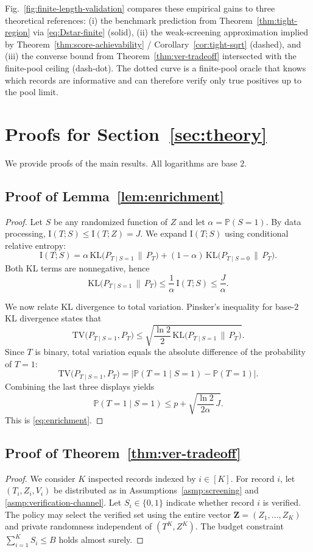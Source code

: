 \documentclass[twocolumn]{scholar7}
\newcommand{\Prob}{\mathbb{P}}
\newcommand{\KL}{\mathrm{KL}}
\newcommand{\I}{\mathrm{I}}
\newcommand{\abs}[1]{\left|#1\right|}
\newcommand{\bracks}[1]{\left[#1\right]}
\newcommand{\idx}[1]{\bracks{#1}} %
\begin{document}
\begin{appendix}
Fig.~\ref{fig:finite-length-validation} compares these empirical gains to three theoretical references: (i) the benchmark prediction from Theorem~\ref{thm:tight-region} via \eqref{eq:Dstar-finite} (solid), (ii) the weak-screening approximation implied by Theorem~\ref{thm:score-achievability} / Corollary~\ref{cor:tight-sqrt} (dashed), and (iii) the converse bound from Theorem~\ref{thm:ver-tradeoff} intersected with the finite-pool ceiling (dash-dot). The dotted curve is a finite-pool oracle that knows which records are informative and can therefore verify only true positives up to the pool limit.






\section{Proofs for Section~\ref{sec:theory}}
\label{sec:proofs}

We provide proofs of the main results.
All logarithms are base $2$.

\subsection{Proof of Lemma~\ref{lem:enrichment}}
\begin{proof}
Let $S$ be any randomized function of $Z$ and let $\alpha=\Prob(S=1)$.
By data processing, $\I(T;S)\le \I(T;Z)=J$.
We expand $\I(T;S)$ using conditional relative entropy:
\[
\I(T;S)
=
\alpha\,\KL\big(P_{T\mid S=1}\,\|\,P_T\big)
+
(1-\alpha)\,\KL\big(P_{T\mid S=0}\,\|\,P_T\big).
\]
Both KL terms are nonnegative, hence
\[
\KL\big(P_{T\mid S=1}\,\|\,P_T\big) \le \frac{1}{\alpha}\,\I(T;S) \le \frac{J}{\alpha}.
\]

We now relate KL divergence to total variation.
Pinsker's inequality for base-$2$ KL divergence states that
\[
\mathrm{TV}\big(P_{T\mid S=1},P_T\big)
\le
\sqrt{\frac{\ln 2}{2}\,\KL\big(P_{T\mid S=1}\,\|\,P_T\big)}.
\]
Since $T$ is binary, total variation equals the absolute difference of the probability of $T=1$:
\[
\mathrm{TV}\big(P_{T\mid S=1},P_T\big)
=
\abs{\Prob(T=1\mid S=1)-\Prob(T=1)}.
\]
Combining the last three displays yields
\[
\Prob(T=1\mid S=1)
\le
p + \sqrt{\frac{\ln 2}{2\alpha}\,J}.
\]
This is \eqref{eq:enrichment}.
\end{proof}

\subsection{Proof of Theorem~\ref{thm:ver-tradeoff}}
\begin{proof}
We consider $K$ inspected records indexed by $i\in\idx{K}$.
For record $i$, let $(T_i,Z_i,V_i)$ be distributed as in Assumptions~\ref{asmp:screening} and \ref{asmp:verification-channel}.
Let $S_i\in\{0,1\}$ indicate whether record $i$ is verified.
The policy may select the verified set using the entire vector $\bm{Z}=(Z_1,\dots,Z_K)$ and private randomness independent of $(T^K,Z^K)$.
The budget constraint $\sum_{i=1}^K S_i\le B$ holds almost surely.


\end{proof}
\end{appendix}
\end{document}
